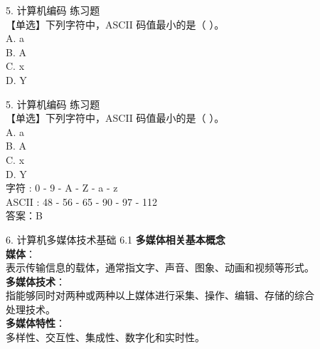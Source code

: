 \documentclass[aspectratio=169]{beamer}
\begin{document}
\begin{frame}[t]{5. 计算机编码} \vspace{20pt}
    练习题\\
    【单选】下列字符中，ASCII 码值最小的是（ ）。\\
A. a\\ B. A\\
C. x\\ D. Y\\
\end{frame}



\begin{frame}[t]{5. 计算机编码} \vspace{20pt}
    练习题\\
    【单选】下列字符中，ASCII 码值最小的是（ ）。\\
A. a\\ B. A\\
C. x\\ D. Y\\
字符  : 0 - 9 - A - Z - a - z\\
ASCII : 48 - 56 - 65 - 90 - 97 - 112\\
答案：B\\
\end{frame}




\begin{frame}[t]{6. 计算机多媒体技术基础} \vspace{20pt}
    6.1 \textbf{多媒体相关基本概念}\\
    \textbf{媒体}：\\表示传输信息的载体，通常指文字、声音、图象、动画和视频等形式。\\
    \textbf{多媒体技术}：\\指能够同时对两种或两种以上媒体进行采集、操作、编辑、存储的综合\\
    处理技术。\\
    \textbf{多媒体特性}：\\
    多样性、交互性、集成性、数字化和实时性。\\

\end{frame}
\end{document}
